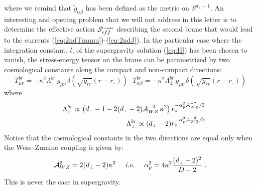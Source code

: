 \documentclass[a4paper,12pt]{article}
\def\action{{\cal S}}
\def\dperp{d_{\scriptscriptstyle\perp}}
\begin{document}
%
where we remind that ${\tilde g}_{\alpha\beta}$ has been defined as the metric
on $S^{\dperp-1}$. An interesting and opening problem that we will not address
in this letter is to determine the effective action $\action_{eff}^{\mbox{\tiny brane}}$
describing the second brane that would lead to the currents
(\ref{eq:2ndTmunu})-(\ref{eq:2ndJ}). In the particular case where the integration
constant, $l$, of the supergravity solution (\ref{eq:H}) has been chosen to vanish,
the stress-energy tensor on the brane can be parametrized by two cosmological
constants along the compact and non-compact directions:
%
\begin{equation}
T_{\mu\nu}^{br} = -\kappa^2 \Lambda^{br}_{\scriptscriptstyle \parallel}
\, g_{\mu\nu}\, \delta (\sqrt{g_{rr}}(r-r_\circ))
\ \ \
T_{\alpha\beta}^{br} = -\kappa^2 \Lambda^{br}_{\scriptscriptstyle \perp}
\, g_{\mu\nu}\, \delta (\sqrt{g_{rr}}(r-r_\circ))
\end{equation}
%
where
%
\begin{eqnarray}
&&
\Lambda^{br}_{\scriptscriptstyle \parallel} \propto
\left( \dperp-1 - 2 (\dperp-2) {\cal A}_{WZ}^{-2}\, \kappa^2 \right)
r_\circ^{-\alpha_p^2 {\cal A}_{WZ}^{-2}/2}
\\
&&
\Lambda^{br}_{\scriptscriptstyle \perp} \propto
(\dperp-2)
r_\circ^{-\alpha_p^2 {\cal A}_{WZ}^{-2}/2}
\end{eqnarray}
%
Notice that the cosmological constants in the two directions are equal only when
the Wess--Zumino coupling is given by:
%
\begin{equation}
{\cal A}_{WZ}^{2} = 2(\dperp-2)\kappa^2
\ \ \ \
\mbox{{\it i.e.}}
\ \ \ \
\alpha_p^2 = 4 \kappa^2 \frac{(\dperp-2)^2}{D-2}
\ .
\end{equation}
%
This is never the case in supergravity.
\end{document}
